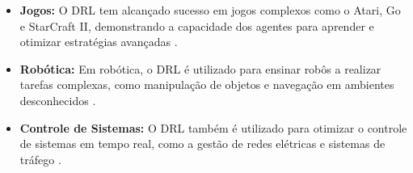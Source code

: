 \begin{itemize}
    \item \textbf{Jogos:} O DRL tem alcançado sucesso em jogos complexos como o Atari, Go e StarCraft II, demonstrando a capacidade dos agentes para aprender e otimizar estratégias avançadas \cite{silver2016mastering}.
    
    \item \textbf{Robótica:} Em robótica, o DRL é utilizado para ensinar robôs a realizar tarefas complexas, como manipulação de objetos e navegação em ambientes desconhecidos \cite{lillicrap2016continuous}.
    
    \item \textbf{Controle de Sistemas:} O DRL também é utilizado para otimizar o controle de sistemas em tempo real, como a gestão de redes elétricas e sistemas de tráfego \cite{mnih2015human}.
\end{itemize}